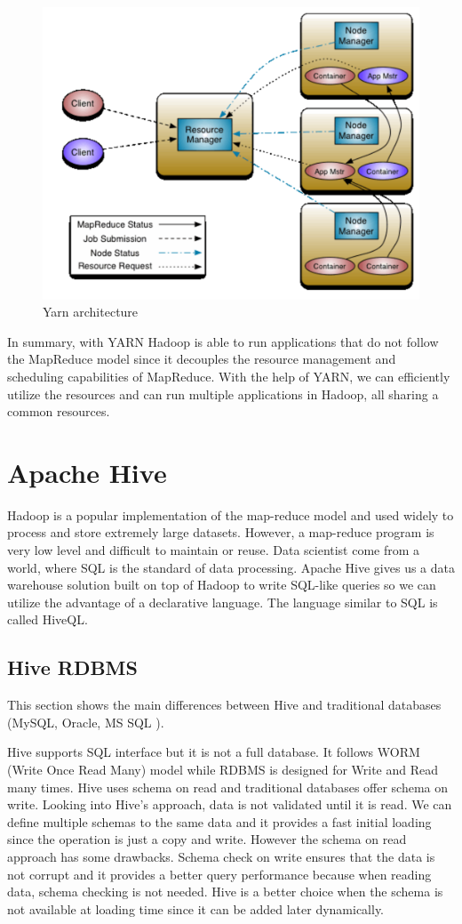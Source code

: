 \begin{figure}[H]
	\includegraphics[width=120mm, keepaspectratio]{figures/yarn.png}
	\centering
	\caption*{Yarn architecture}
	\centering
\end{figure}

In summary, with YARN Hadoop is able to run applications that do not follow the MapReduce model since it decouples the resource management and scheduling capabilities of MapReduce. With the help of YARN, we can efficiently utilize the resources and can run multiple applications in Hadoop, all sharing a common resources.

\section{Apache Hive}
Hadoop is a popular implementation of the map-reduce model and used widely to process and store extremely large datasets. However, a map-reduce program is very low level and difficult to maintain or reuse. Data scientist come from a world, where SQL is the standard of data processing. Apache Hive gives us a data warehouse solution built on top of Hadoop to write SQL-like queries so we can utilize the advantage of a declarative language. The language similar to SQL is called HiveQL.

\subsection{Hive \vs RDBMS}
This section shows the main differences between Hive and traditional databases (\eg MySQL, Oracle, MS SQL \etc).

Hive supports SQL interface but it is not a full database. It follows WORM (Write Once Read Many) model while RDBMS is designed for Write and Read many times. Hive uses schema on read and traditional databases offer schema on write. Looking into Hive's approach, data is not validated until it is read. We can define multiple schemas to the same data and it provides a fast initial loading since the operation is just a copy and write. However the schema on read approach has some drawbacks. Schema check on write ensures that the data is not corrupt and it provides a better query performance because when reading data, schema checking is not needed. Hive is a better choice when the schema is not available at loading time since it can be added later dynamically. 

